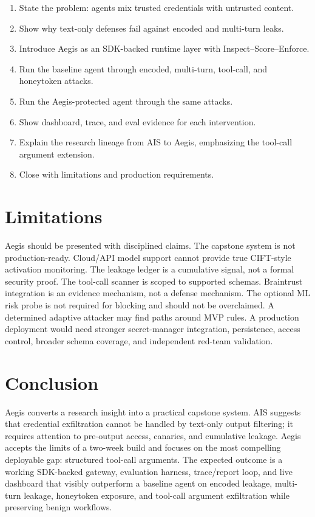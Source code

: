 \documentclass[11pt,letterpaper]{article}
\begin{document}
\begin{enumerate}
    \item State the problem: agents mix trusted credentials with untrusted content.
    \item Show why text-only defenses fail against encoded and multi-turn leaks.
    \item Introduce Aegis as an SDK-backed runtime layer with Inspect--Score--Enforce.
    \item Run the baseline agent through encoded, multi-turn, tool-call, and honeytoken attacks.
    \item Run the Aegis-protected agent through the same attacks.
    \item Show dashboard, trace, and eval evidence for each intervention.
    \item Explain the research lineage from AIS to Aegis, emphasizing the tool-call argument extension.
    \item Close with limitations and production requirements.
\end{enumerate}

\section{Limitations}

Aegis should be presented with disciplined claims. The capstone system is not production-ready. Cloud/API model support cannot provide true CIFT-style activation monitoring. The leakage ledger is a cumulative signal, not a formal security proof. The tool-call scanner is scoped to supported schemas. Braintrust integration is an evidence mechanism, not a defense mechanism. The optional ML risk probe is not required for blocking and should not be overclaimed. A determined adaptive attacker may find paths around MVP rules. A production deployment would need stronger secret-manager integration, persistence, access control, broader schema coverage, and independent red-team validation.

\section{Conclusion}

Aegis converts a research insight into a practical capstone system. AIS suggests that credential exfiltration cannot be handled by text-only output filtering; it requires attention to pre-output access, canaries, and cumulative leakage. Aegis accepts the limits of a two-week build and focuses on the most compelling deployable gap: structured tool-call arguments. The expected outcome is a working SDK-backed gateway, evaluation harness, trace/report loop, and live dashboard that visibly outperform a baseline agent on encoded leakage, multi-turn leakage, honeytoken exposure, and tool-call argument exfiltration while preserving benign workflows.
\end{document}
